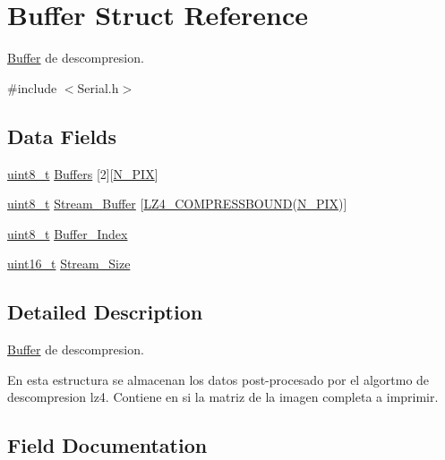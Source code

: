 \hypertarget{struct_buffer}{}\section{Buffer Struct Reference}
\label{struct_buffer}


\mbox{\hyperlink{struct_buffer}{Buffer}} de descompresion.  




{\ttfamily \#include $<$Serial.\+h$>$}

\subsection*{Data Fields}
\begin{DoxyCompactItemize}
\item 
\mbox{\hyperlink{_regs_l_p_c1769_8h_aba7bc1797add20fe3efdf37ced1182c5}{uint8\+\_\+t}} \mbox{\hyperlink{struct_buffer_aa46fd86a8467fd9c22e27aecd2ce5a6c}{Buffers}} \mbox{[}2\mbox{]}\mbox{[}\mbox{\hyperlink{_serial_8h_af6da69ccda8aa07b1fafe1db53bd4051}{N\+\_\+\+P\+IX}}\mbox{]}
\item 
\mbox{\hyperlink{_regs_l_p_c1769_8h_aba7bc1797add20fe3efdf37ced1182c5}{uint8\+\_\+t}} \mbox{\hyperlink{struct_buffer_a8f92727e7b44eade72f7770483f92e40}{Stream\+\_\+\+Buffer}} \mbox{[}\mbox{\hyperlink{lz4_8h_a2453a423fd34640a0afbbf57ed0a5399}{L\+Z4\+\_\+\+C\+O\+M\+P\+R\+E\+S\+S\+B\+O\+U\+ND}}(\mbox{\hyperlink{_serial_8h_af6da69ccda8aa07b1fafe1db53bd4051}{N\+\_\+\+P\+IX}})\mbox{]}
\item 
\mbox{\hyperlink{_regs_l_p_c1769_8h_aba7bc1797add20fe3efdf37ced1182c5}{uint8\+\_\+t}} \mbox{\hyperlink{struct_buffer_a4b7b77de63c2c7d070aed73400f06d61}{Buffer\+\_\+\+Index}}
\item 
\mbox{\hyperlink{_regs_l_p_c1769_8h_a273cf69d639a59973b6019625df33e30}{uint16\+\_\+t}} \mbox{\hyperlink{struct_buffer_ad2ce1666d61d13e70634895da5a90696}{Stream\+\_\+\+Size}}
\end{DoxyCompactItemize}


\subsection{Detailed Description}
\mbox{\hyperlink{struct_buffer}{Buffer}} de descompresion. 

En esta estructura se almacenan los datos post-\/procesado por el algortmo de descompresion lz4. Contiene en si la matriz de la imagen completa a imprimir. 

\subsection{Field Documentation}
\mbox{\label{struct_buffer_a4b7b77de63c2c7d070aed73400f06d61}} 

